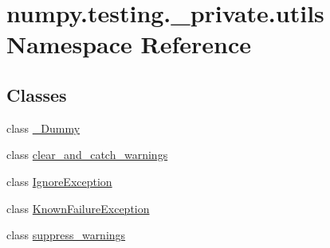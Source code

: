 \hypertarget{namespacenumpy_1_1testing_1_1__private_1_1utils}{}\section{numpy.\+testing.\+\_\+private.\+utils Namespace Reference}
\label{namespacenumpy_1_1testing_1_1__private_1_1utils}
\subsection*{Classes}
\begin{DoxyCompactItemize}
\item 
class \hyperlink{classnumpy_1_1testing_1_1__private_1_1utils_1_1__Dummy}{\+\_\+\+Dummy}
\item 
class \hyperlink{classnumpy_1_1testing_1_1__private_1_1utils_1_1clear__and__catch__warnings}{clear\+\_\+and\+\_\+catch\+\_\+warnings}
\item 
class \hyperlink{classnumpy_1_1testing_1_1__private_1_1utils_1_1IgnoreException}{Ignore\+Exception}
\item 
class \hyperlink{classnumpy_1_1testing_1_1__private_1_1utils_1_1KnownFailureException}{Known\+Failure\+Exception}
\item 
class \hyperlink{classnumpy_1_1testing_1_1__private_1_1utils_1_1suppress__warnings}{suppress\+\_\+warnings}
\end{DoxyCompactItemize}
